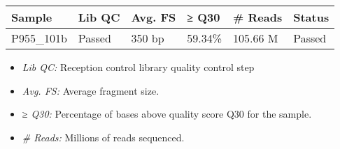 \documentclass[12pt]{article}
\begin{document}
\begin{longtable}[c]{@{}llllll@{}}
\toprule
\begin{minipage}[b]{0.15\columnwidth}\raggedright\strut
Sample
\strut\end{minipage} &
\begin{minipage}[b]{0.12\columnwidth}\raggedright\strut
Lib QC
\strut\end{minipage} &
\begin{minipage}[b]{0.16\columnwidth}\raggedright\strut
Avg. FS
\strut\end{minipage} &
\begin{minipage}[b]{0.12\columnwidth}\raggedright\strut
≥ Q30
\strut\end{minipage} &
\begin{minipage}[b]{0.15\columnwidth}\raggedright\strut
\# Reads
\strut\end{minipage} &
\begin{minipage}[b]{0.12\columnwidth}\raggedright\strut
Status
\strut\end{minipage}\tabularnewline
\midrule
\endhead
\begin{minipage}[t]{0.15\columnwidth}\raggedright\strut
P955\_101b
\strut\end{minipage} &
\begin{minipage}[t]{0.12\columnwidth}\raggedright\strut
Passed
\strut\end{minipage} &
\begin{minipage}[t]{0.16\columnwidth}\raggedright\strut
350 bp
\strut\end{minipage} &
\begin{minipage}[t]{0.12\columnwidth}\raggedright\strut
59.34\%
\strut\end{minipage} &
\begin{minipage}[t]{0.15\columnwidth}\raggedright\strut
105.66 M
\strut\end{minipage} &
\begin{minipage}[t]{0.12\columnwidth}\raggedright\strut
Passed
\strut\end{minipage}\tabularnewline
\bottomrule
\end{longtable}

\begin{itemize}
\itemsep1pt\parskip0pt
\item
  \emph{Lib QC:} Reception control library quality control step
\item
  \emph{Avg. FS:} Average fragment size.
\item
  \emph{≥ Q30:} Percentage of bases above quality score Q30 for the
  sample.
\item
  \emph{\# Reads:} Millions of reads sequenced.
\end{itemize}
\end{document}
